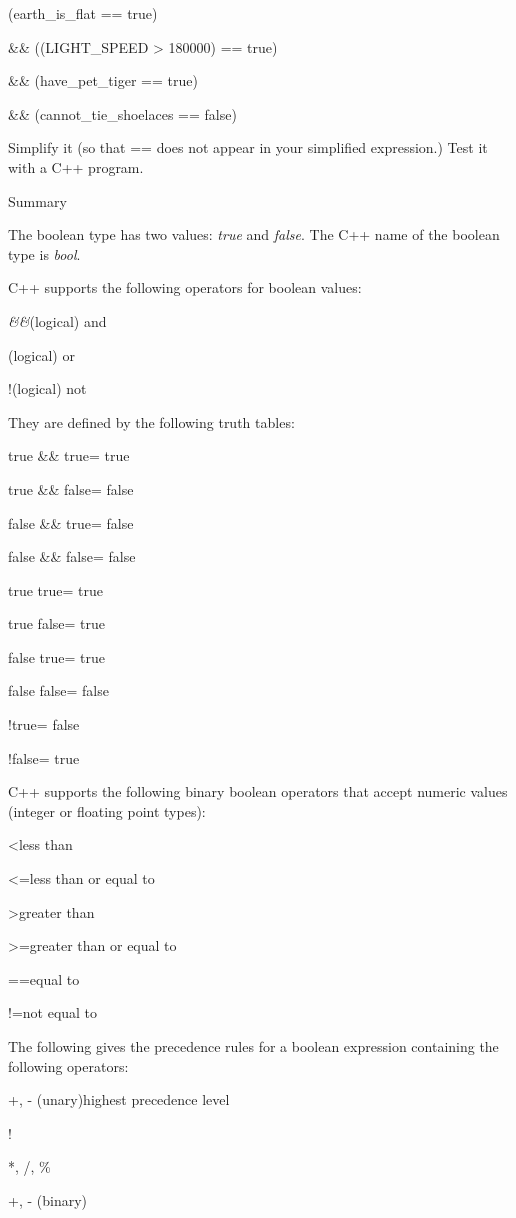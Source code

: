 \documentclass[
]{article}
\begin{document}
(earth\_is\_flat == true)

\&\& ((LIGHT\_SPEED \textgreater{} 180000) == true)

\&\& (have\_pet\_tiger == true)

\&\& (cannot\_tie\_shoelaces == false)

Simplify it (so that == does not appear in your simplified expression.)
Test it with a C++ program.

Summary

The boolean type has two values: \emph{true} and \emph{false}. The C++
name of the boolean type is \emph{bool}.

C++ supports the following operators for boolean values:

\emph{\&\&}(logical) and

\emph{\textbar\textbar{}}(logical) or

!(logical) not

They are defined by the following truth tables:

true \&\& true= true

true \&\& false= false

false \&\& true= false

false \&\& false= false

true \textbar\textbar{} true= true

true \textbar\textbar{} false= true

false \textbar\textbar{} true= true

false \textbar\textbar{} false= false

!true= false

!false= true

C++ supports the following binary boolean operators that accept numeric
values (integer or floating point types):

\textless less than

\textless=less than or equal to

\textgreater greater than

\textgreater=greater than or equal to

==equal to

!=not equal to

The following gives the precedence rules for a boolean expression
containing the following operators:

+, - (unary)highest precedence level

!

*, /, \%

+, - (binary)
\end{document}
